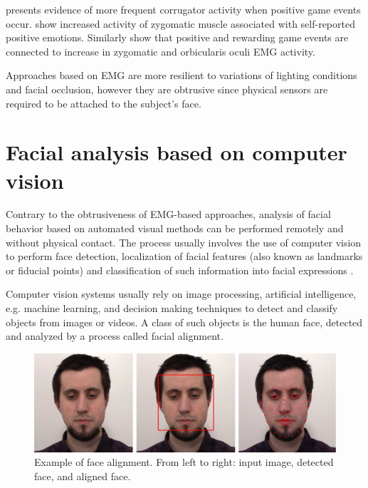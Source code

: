 \textcite{hazlett2006measuring} presents evidence of more frequent corrugator activity when positive game events occur. \textcite{tijs2008dynamic} show increased activity of zygomatic muscle associated with self-reported positive emotions. Similarly \textcite{ravaja20051} show that positive and rewarding game events are connected to increase in zygomatic and orbicularis oculi EMG activity.

Approaches based on EMG are more resilient to variations of lighting conditions and facial occlusion, however they are obtrusive since physical sensors are required to be attached to the subject's face.

\section{Facial analysis based on computer vision}

Contrary to the obtrusiveness of EMG-based approaches, analysis of facial behavior based on automated visual methods can be performed remotely and without physical contact. The process usually involves the use of computer vision to perform face detection, localization of facial features (also known as landmarks or fiducial points) and classification of such information into facial expressions \parencite{salah2010communication}.

Computer vision systems usually rely on image processing, artificial intelligence, e.g. machine learning, and decision making techniques to detect and classify objects from images or videos. A class of such objects is the human face, detected and analyzed by a process called facial alignment.

\begin{figure}[h]
    \centering
    \includegraphics[width=\linewidth]{Content/figures/face-alignment.jpg}
    \caption{Example of face alignment. From left to right: input image, detected face, and aligned face.}
    \label{fig:alignment}
\end{figure}

